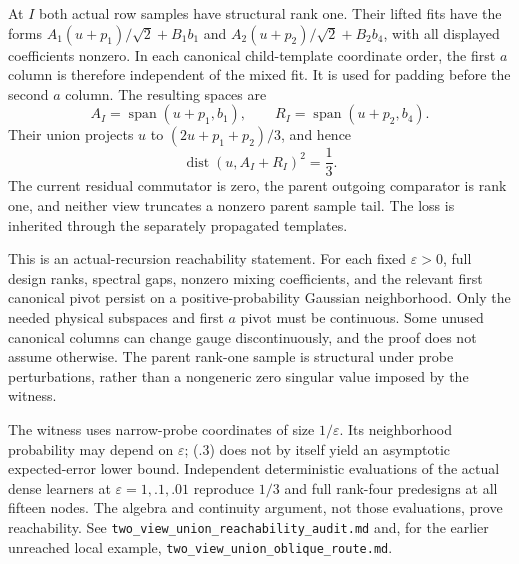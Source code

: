 \documentclass[11pt,oneside,openany,a4paper]{report}
\numberwithin{equation}{chapter}
\theoremstyle{definition}
\theoremstyle{remark}
\newcommand{\sourcefile}[1]{{\small\nolinkurl{#1}}}
\begin{document}
At $I$ both actual row samples have structural rank one.  Their lifted
fits have the forms
$A_1(u+p_1)/\sqrt2+B_1b_1$ and
$A_2(u+p_2)/\sqrt2+B_2b_4$, with all displayed coefficients nonzero.
In each canonical child-template coordinate order, the first $a$
column is therefore independent of the mixed fit.  It is used for
padding before the second $a$ column.  The resulting spaces are
\[
 A_I=\operatorname{span}(u+p_1,b_1),\qquad
 R_I=\operatorname{span}(u+p_2,b_4).
\]
Their union projects $u$ to $(2u+p_1+p_2)/3$, and hence
\[
 \operatorname{dist}(u,A_I+R_I)^2=\frac13.
 \tag{\thechapter.3}
\]
The current residual commutator is zero, the parent outgoing comparator
is rank one, and neither view truncates a nonzero parent sample tail.
The loss is inherited through the separately propagated templates.

This is an actual-recursion reachability statement.  For each fixed
$\varepsilon>0$, full design ranks, spectral gaps, nonzero mixing
coefficients, and the relevant first canonical pivot persist on a
positive-probability Gaussian neighborhood.  Only the needed physical
subspaces and first $a$ pivot must be continuous.  Some unused canonical
columns can change gauge discontinuously, and the proof does not assume
otherwise.  The parent rank-one sample is structural under probe
perturbations, rather than a nongeneric zero singular value imposed by
the witness.

The witness uses narrow-probe coordinates of size $1/\varepsilon$.
Its neighborhood probability may depend on $\varepsilon$; (\thechapter.3)
does not by itself yield an asymptotic expected-error lower bound.
Independent deterministic evaluations of the actual dense learners at
$\varepsilon=1,.1,.01$ reproduce $1/3$ and full rank-four predesigns at
all fifteen nodes.  The algebra and continuity argument, not those
evaluations, prove reachability.  See
\sourcefile{two_view_union_reachability_audit.md} and, for the earlier
unreached local example, \sourcefile{two_view_union_oblique_route.md}.
\end{document}
